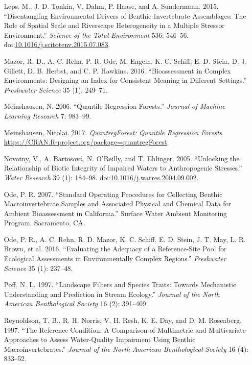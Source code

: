 \documentclass[]{article}
\begin{document}
\hypertarget{ref-Leps15}{}
Leps, M., J. D. Tonkin, V. Dahm, P. Haase, and A. Sundermann. 2015.
``Disentangling Environmental Drivers of Benthic Invertebrate
Assemblages: The Role of Spatial Scale and Riverscape Heterogeneity in a
Multiple Stressor Environment.'' \emph{Science of the Total Environment}
536: 546--56.
doi:\href{https://doi.org/10.1016/j.scitotenv.2015.07.083}{10.1016/j.scitotenv.2015.07.083}.

\hypertarget{ref-Mazor16}{}
Mazor, R. D., A. C. Rehn, P. R. Ode, M. Engeln, K. C. Schiff, E. D.
Stein, D. J. Gillett, D. B. Herbst, and C. P. Hawkins. 2016.
``Bioassessment in Complex Environments: Designing an Index for
Consistent Meaning in Different Settings.'' \emph{Freshwater Science} 35
(1): 249--71.

\hypertarget{ref-Meinshausen06}{}
Meinshausen, N. 2006. ``Quantile Regression Forests.'' \emph{Journal of
Machine Learning Research} 7: 983--99.

\hypertarget{ref-Meinshausen17}{}
Meinshausen, Nicolai. 2017. \emph{QuantregForest: Quantile Regression
Forests}. \url{https://CRAN.R-project.org/package=quantregForest}.

\hypertarget{ref-Novotny05}{}
Novotny, V., A. Bartosová, N. O'Reilly, and T. Ehlinger. 2005.
``Unlocking the Relationship of Biotic Integrity of Impaired Waters to
Anthropogenic Stresses.'' \emph{Water Research} 39 (1): 184--98.
doi:\href{https://doi.org/10.1016/j.watres.2004.09.002}{10.1016/j.watres.2004.09.002}.

\hypertarget{ref-Ode07}{}
Ode, P. R. 2007. ``Standard Operating Procedures for Collecting Benthic
Macroinvertebrate Samples and Associated Physical and Chemical Data for
Ambient Bioassessment in California.'' Surface Water Ambient Monitoring
Program. Sacramento, CA.

\hypertarget{ref-Ode16}{}
Ode, P. R., A. C. Rehn, R. D. Mazor, K. C. Schiff, E. D. Stein, J. T.
May, L. R. Brown, et al. 2016. ``Evaluating the Adequacy of a
Reference-Site Pool for Ecological Assessments in Environmentally
Complex Regions.'' \emph{Freshwater Science} 35 (1): 237--48.

\hypertarget{ref-Poff97}{}
Poff, N. L. 1997. ``Landscape Filters and Species Traits: Towards
Mechanistic Understanding and Prediction in Stream Ecology.''
\emph{Journal of the North American Benthological Society} 16 (2):
391--409.

\hypertarget{ref-Reynoldson97}{}
Reynoldson, T. B., R. H. Norris, V. H. Resh, K. E. Day, and D. M.
Rosenberg. 1997. ``The Reference Condition: A Comparison of Multimetric
and Multivariate Approaches to Assess Water-Quality Impairment Using
Benthic Macroinvertebrates.'' \emph{Journal of the North American
Benthological Society} 16 (4): 833--52.
\end{document}
